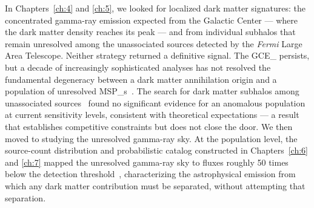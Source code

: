 
In Chapters~\ref{ch:4} and \ref{ch:5}, we looked for localized dark matter signatures: the concentrated gamma-ray emission expected from the Galactic Center --- where the dark matter density reaches its peak --- and from individual subhalos that remain unresolved among the unassociated sources detected by the \textit{Fermi} Large Area Telescope.
Neither strategy returned a definitive signal.
The \gls{GCE_} persists, but a decade of increasingly sophisticated analyses has not resolved the fundamental degeneracy between a dark matter annihilation origin and a population of unresolved \glspl{MSP_}~\cite{Daylan:2014rsa,Bartels:2015aea,Leane:2019xiy,Chang:2019ars}. The search for dark matter subhalos among unassociated sources~\cite{Amerio:2025fhz} found no significant evidence for an anomalous population at current sensitivity levels, consistent with theoretical expectations --- a result that establishes competitive constraints but does not close the door. 
We then moved to studying the unresolved gamma-ray sky. 
At the population level, the source-count distribution and probabilistic catalog constructed in Chapters~\ref{ch:6} and \ref{ch:7} mapped the unresolved gamma-ray sky to fluxes roughly 50 times below the detection threshold~\cite{Amerio:2023uet,Amerio:2023rjn,Cuoco-1pdf}, characterizing the astrophysical emission from which any dark matter contribution must be separated, without attempting that separation.


